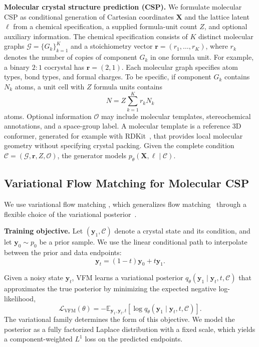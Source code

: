 \textbf{Molecular crystal structure prediction (CSP).}
We formulate molecular CSP as conditional generation of Cartesian coordinates
$\mathbf{X}$ and the lattice latent $\boldsymbol{\ell}$ from a chemical
specification, a supplied formula-unit count $Z$, and optional auxiliary
information. The chemical specification consists of $K$ distinct molecular
graphs $\mathcal{G}=\{G_k\}_{k=1}^{K}$ and a stoichiometry vector
$\mathbf{r}=(r_1,\ldots,r_K)$, where $r_k$ denotes the number of copies of
component $G_k$ in one formula unit. For example, a binary $2{:}1$ cocrystal
has $\mathbf{r}=(2,1)$. Each molecular graph specifies atom types, bond types,
and formal charges. To be specific, if component $G_k$ contains $N_k$ atoms, a unit cell with $Z$ formula units
contains
\[
N = Z\sum_{k=1}^{K} r_k N_k
\]
atoms. Optional information $\mathcal{O}$ may include molecular templates,
stereochemical annotations, and a space-group label. A molecular template is a
reference 3D conformer, generated for example with RDKit~\citep{rdkit}, that
provides local molecular geometry without specifying crystal packing. Given the
complete condition $\mathcal{C}=(\mathcal{G},\mathbf{r},Z,\mathcal{O})$, the
generator models $p_{\theta}(\mathbf{X},\boldsymbol{\ell}\mid\mathcal{C})$.

\subsection{Variational Flow Matching for Molecular CSP}
\label{sec:method-vfm}

We use variational flow matching \citep[VFM;][]{eijkelboom2024variational}, which generalizes flow matching~\citep{lipman2023flow}
through a flexible choice of the
variational posterior~\citep{zaghen2025riemannian}.

\textbf{Training objective.} Let $(\mathbf{y}_1,\mathcal{C})$ denote a crystal state and its condition, and let
$\mathbf{y}_0\sim p_0$ be a prior sample.
We use the linear conditional path to interpolate between the prior and data endpoints:
\begin{equation}
\label{eq:method-flow-path}
\mathbf{y}_t=(1-t)\mathbf{y}_0+t\mathbf{y}_1.
\end{equation}

Given a noisy state $\mathbf{y}_t$,
VFM learns a variational posterior
$q_{\theta}(\mathbf{y}_1\mid\mathbf{y}_t,t,\mathcal{C})$
that approximates the true posterior by minimizing the expected negative log-likelihood,
\begin{equation}
\label{eq:method-vfm-general}
\mathcal{L}_{\mathrm{VFM}}(\theta)
=-\mathbb{E}_{\mathbf{y}_1,\mathbf{y}_t,t}\!\left[
\log q_{\theta}(\mathbf{y}_1\mid\mathbf{y}_t,t,\mathcal{C})
\right].
\end{equation}
The variational family determines the form of this objective.
We model the posterior as a fully factorized Laplace distribution with a fixed scale,
which yields a component-weighted $L^1$ loss on the predicted endpoints.

